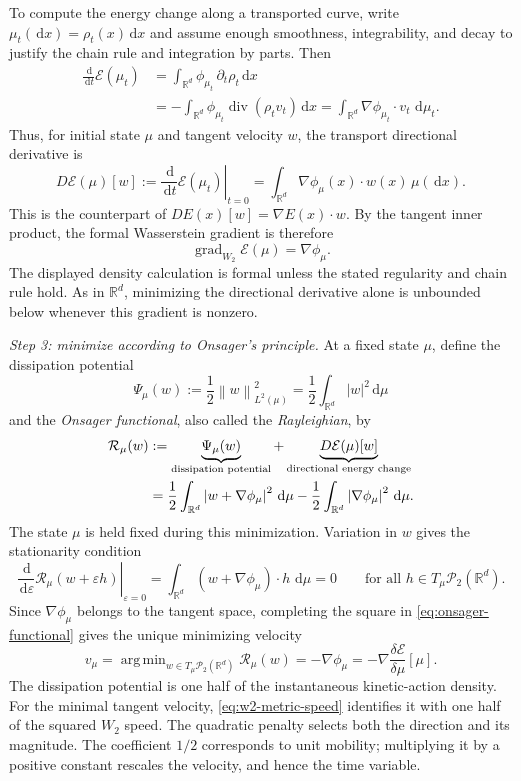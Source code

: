 \documentclass[11pt]{amsart}
\numberwithin{equation}{section}
\theoremstyle{plain}
\newcommand{\R}{\mathbb{R}}
\newcommand{\cP}{\mathcal{P}}
\newcommand{\dd}{\,\mathrm{d}}
\newcommand{\abs}[1]{\left\lvert#1\right\rvert}
\newcommand{\norm}[1]{\left\lVert#1\right\rVert}
\DeclareMathOperator{\diver}{div}
\DeclareMathOperator*{\argmin}{arg\,min}
\begin{document}
To compute the energy change along a transported curve, write
$\mu_t(\dd x)=\rho_t(x)\dd x$ and assume enough smoothness, integrability,
and decay to justify the chain rule and integration by parts.  Then
\begin{align*}
 \frac{\dd}{\dd t}\mathcal E(\mu_t)
 &=\int_{\R^d}\phi_{\mu_t}\,\partial_t\rho_t\dd x\\
 &=-\int_{\R^d}\phi_{\mu_t}\diver(\rho_t v_t)\dd x
 =\int_{\R^d}\nabla\phi_{\mu_t}\cdot v_t\,\dd\mu_t.
\end{align*}
Thus, for initial state $\mu$ and tangent velocity $w$, the transport
directional derivative is
\begin{equation}\label{eq:wasserstein-directional-energy}
 D\mathcal E(\mu)[w]
 :=\left.\frac{\dd}{\dd t}\mathcal E(\mu_t)\right|_{t=0}
 =\int_{\R^d}\nabla\phi_\mu(x)\cdot w(x)\,\mu(\dd x).
\end{equation}
This is the counterpart of $DE(x)[w]=\nabla E(x)\cdot w$.  By the tangent
inner product, the formal Wasserstein gradient is therefore
\[
 \operatorname{grad}_{W_2}\mathcal E(\mu)=\nabla\phi_\mu.
\]
The displayed density calculation is formal unless the stated regularity
and chain rule hold.  As in $\R^d$, minimizing the directional derivative
alone is unbounded below whenever this gradient is nonzero.

\emph{Step 3: minimize according to Onsager's principle.}
At a fixed state $\mu$, define the dissipation potential
\[
 \Psi_\mu(w):=\frac12\norm{w}_{L^2(\mu)}^2
 =\frac12\int_{\R^d}\abs w^2\dd\mu
\]
and the \emph{Onsager functional}, also called the \emph{Rayleighian}, by
\begin{align}
 \mathcal R_\mu(w)
 &:=\underbrace{\Psi_\mu(w)}_{\text{dissipation potential}}
   +\underbrace{D\mathcal E(\mu)[w]}
      _{\text{directional energy change}} \notag\\
 &=\frac12\int_{\R^d}\abs{w+\nabla\phi_\mu}^2\dd\mu
   -\frac12\int_{\R^d}\abs{\nabla\phi_\mu}^2\dd\mu.
 \label{eq:onsager-functional}
\end{align}
The state $\mu$ is held fixed during this minimization.  Variation in $w$
gives the stationarity condition
\[
 \left.\frac{\dd}{\dd\varepsilon}\mathcal R_\mu(w+\varepsilon h)
 \right|_{\varepsilon=0}
 =\int_{\R^d}(w+\nabla\phi_\mu)\cdot h\,\dd\mu=0
 \qquad\text{for all }h\in T_\mu\cP_2(\R^d).
\]
Since $\nabla\phi_\mu$ belongs to the tangent space, completing the square
in \eqref{eq:onsager-functional} gives the unique minimizing velocity
\[
 v_\mu=\argmin_{w\in T_\mu\cP_2(\R^d)}\mathcal R_\mu(w)
 =-\nabla\phi_\mu
 =-\nabla\frac{\delta\mathcal E}{\delta\mu}[\mu].
\]
The dissipation potential is one half of the instantaneous kinetic-action
density.  For the minimal tangent velocity, \eqref{eq:w2-metric-speed}
identifies it with one half of the squared $W_2$ speed.
The quadratic penalty selects both the direction and its magnitude.  The
coefficient $1/2$ corresponds to unit mobility; multiplying it by a positive
constant rescales the velocity, and hence the time variable.
\end{document}
